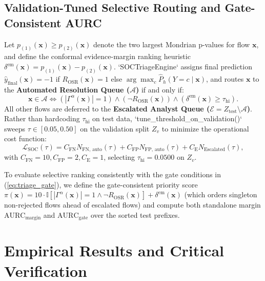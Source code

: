﻿\documentclass[conference]{IEEEtran}
\begin{document}
\subsection{Validation-Tuned Selective Routing and Gate-Consistent AURC}
Let $p_{(1)}(\mathbf{x}) \ge p_{(2)}(\mathbf{x})$ denote the two largest Mondrian p-values for flow $\mathbf{x}$, and define the conformal evidence-margin ranking heuristic $\delta^{\text{em}}(\mathbf{x}) = p_{(1)}(\mathbf{x}) - p_{(2)}(\mathbf{x})$. `SOCTriageEngine` assigns final prediction $\hat{y}_{\text{final}}(\mathbf{x}) = -1$ if $R_{\text{OSR}}(\mathbf{x}) = 1$ else $\arg\max_{c} \hat{P}_h(Y = c \mid \mathbf{x})$, and routes $\mathbf{x}$ to the \textbf{Automated Resolution Queue ($\mathcal{A}$)} if and only if:
\begin{equation}
\mathbf{x} \in \mathcal{A} \iff \left(|\Gamma^\alpha(\mathbf{x})| = 1\right) \land \left(\neg R_{\text{OSR}}(\mathbf{x})\right) \land \left(\delta^{\text{em}}(\mathbf{x}) \ge \tau_{\text{hi}}\right).
\label{eq:triage_gate}
\end{equation}
All other flows are deferred to the \textbf{Escalated Analyst Queue ($\mathcal{E} = Z_{\text{test}} \setminus \mathcal{A}$)}. Rather than hardcoding $\tau_{\text{hi}}$ on test data, `tune_threshold_on_validation()` sweeps $\tau \in [0.05, 0.50]$ on the validation split $Z_v$ to minimize the operational cost function:
\begin{equation}
\mathcal{L}_{\text{SOC}}(\tau) = C_{\text{FN}} N_{\text{FN, auto}}(\tau) + C_{\text{FP}} N_{\text{FP, auto}}(\tau) + C_{\text{E}} N_{\text{Escalated}}(\tau),
\label{eq:soc_cost}
\end{equation}
with $C_{\text{FN}} = 10, C_{\text{FP}} = 2, C_{\text{E}} = 1$, selecting $\tau_{\text{hi}} = 0.0500$ on $Z_v$.

To evaluate selective ranking consistently with the gate conditions in (\ref{eq:triage_gate}), we define the gate-consistent priority score $\pi(\mathbf{x}) = 10 \cdot \mathbb{I}[|\Gamma^\alpha(\mathbf{x})| = 1 \land \neg R_{\text{OSR}}(\mathbf{x})] + \delta^{\text{em}}(\mathbf{x})$ (which orders singleton non-rejected flows ahead of escalated flows) and compute both standalone margin $\text{AURC}_{\text{margin}}$ and $\text{AURC}_{\text{gate}}$ over the sorted test prefixes.

\section{Empirical Results and Critical Verification}
\end{document}
